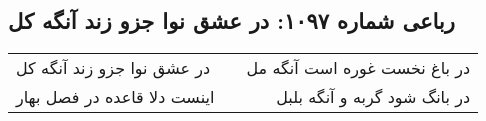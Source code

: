 \begin{center}
\section*{رباعی شماره ۱۰۹۷: در عشق نوا جزو زند آنگه کل}
\label{sec:1097}
\begin{longtable}{l p{0.5cm} r}
در عشق نوا جزو زند آنگه کل
&&
در باغ نخست غوره است آنگه مل
\\
اینست دلا قاعده در فصل بهار
&&
در بانگ شود گربه و آنگه بلبل
\\
\end{longtable}
\end{center}
